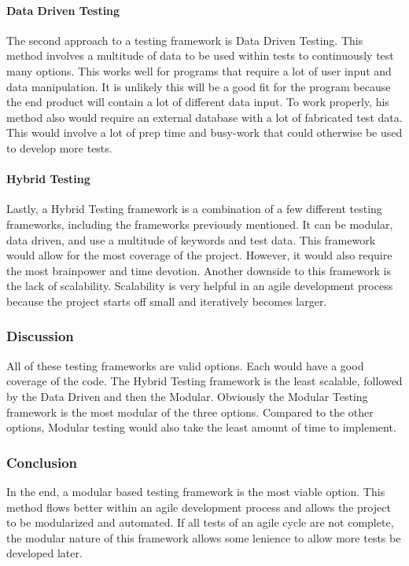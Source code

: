 \documentclass[draftclsnofoot, onecolumn, compsoc, 10pt]{IEEEtran}
\begin{document}
\paragraph{Data Driven Testing}
The second approach to a testing framework is Data Driven Testing. This method involves a multitude of data to be used within tests to continuously test many options. This works well for programs that require a lot of user input and data manipulation. It is unlikely this will be a good fit for the program because the end product will contain a lot of different data input. To work properly, his method also would require an external database with a lot of fabricated test data. This would involve a lot of prep time and busy-work that could otherwise be used to develop more tests.
\paragraph{Hybrid Testing}
Lastly, a Hybrid Testing framework is a combination of a few different testing frameworks, including the frameworks previously mentioned. It can be modular, data driven, and use a multitude of keywords and test data. This framework would allow for the most coverage of the project. However, it would also require the most brainpower and time devotion. Another downside to this framework is the lack of scalability. Scalability is very helpful in an agile development process because the project starts off small and iteratively becomes larger.
\subsubsection{Discussion}
All of these testing frameworks are valid options. Each would have a good coverage of the code. The Hybrid Testing framework is the least scalable, followed by the Data Driven and then the Modular. Obviously the Modular Testing framework is the most modular of the three options. Compared to the other options, Modular testing would also take the least amount of time to implement.

\subsubsection{Conclusion}
In the end, a modular based testing framework is the most viable option. This method flows better within an agile development process and allows the project to be modularized and automated. If all tests of an agile cycle are not complete, the modular nature of this framework allows some lenience to allow more tests be developed later.\cite{Software_Testing_Help}
\end{document}
